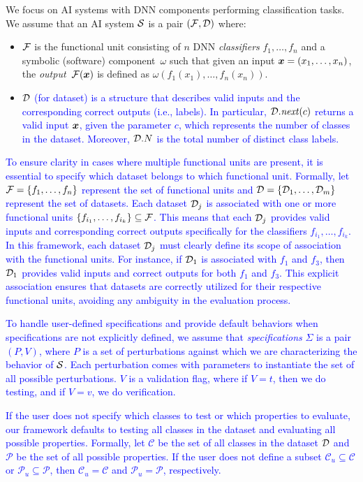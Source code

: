 We focus on AI systems with DNN components performing classification tasks. We assume that an AI system $\S$ is a pair $(\F,\D)$ where:
\begin{itemize}
    \item $\F$ is the functional unit consisting of $n$ DNN \emph{classifiers} $f_1,\dots,f_n$ and a symbolic (software) component~$\omega$ such that given an input $\avec{x}=(x_1,\dots,x_n)$, the \emph{output}~$\F(\avec{x})$ is defined as $\omega(f_1(x_1),\dots,f_n(x_n))$.
    \item \textcolor{blue}{ $\D$ (for dataset) is a structure that describes valid inputs and the corresponding correct outputs (i.e., labels). In particular, $\D.\mathit{next}(c)$ returns a valid input $\avec{x}$, given the parameter $c$, which represents the number of classes in the dataset. Moreover, $\D.N$ is the total number of distinct class labels.}
\end{itemize}

\textcolor{blue}{
To ensure clarity in cases where multiple functional units are present, it is essential to specify which dataset belongs to which functional unit. Formally, let $\F = \{f_1, \dots, f_n\}$ represent the set of functional units and $\D = \{\D_1, \dots, \D_m\}$ represent the set of datasets. Each dataset $\D_j$ is associated with one or more functional units $\{f_{i_1}, \dots, f_{i_k}\} \subseteq \F$. This means that each $\D_j$ provides valid inputs and corresponding correct outputs specifically for the classifiers $f_{i_1}, \dots, f_{i_k}$. In this framework, each dataset $\D_j$ must clearly define its scope of association with the functional units. For instance, if $\D_1$ is associated with $f_1$ and $f_3$, then $\D_1$ provides valid inputs and correct outputs for both $f_1$ and $f_3$. This explicit association ensures that datasets are correctly utilized for their respective functional units, avoiding any ambiguity in the evaluation process.}


\textcolor{blue}{
To handle user-defined specifications and provide default behaviors when specifications are not explicitly defined, we assume that \emph{specifications} $\Sigma$ is a pair $(P, V)$, where $P$ is a set of perturbations against which we are characterizing the behavior of $\S$. Each perturbation comes with parameters to instantiate the set of all possible perturbations. $V$ is a validation flag, where if $V=t$, then we do testing, and if $V=v$, we do verification.}

\textcolor{blue}{If the user does not specify which classes to test or which properties to evaluate, our framework defaults to testing all classes in the dataset and evaluating all possible properties. Formally, let $\mathcal{C}$ be the set of all classes in the dataset $\D$ and $\mathcal{P}$ be the set of all possible properties. If the user does not define a subset $\mathcal{C}_u \subseteq \mathcal{C}$ or $\mathcal{P}_u \subseteq \mathcal{P}$, then $\mathcal{C}_u = \mathcal{C}$ and $\mathcal{P}_u = \mathcal{P}$, respectively.
}

